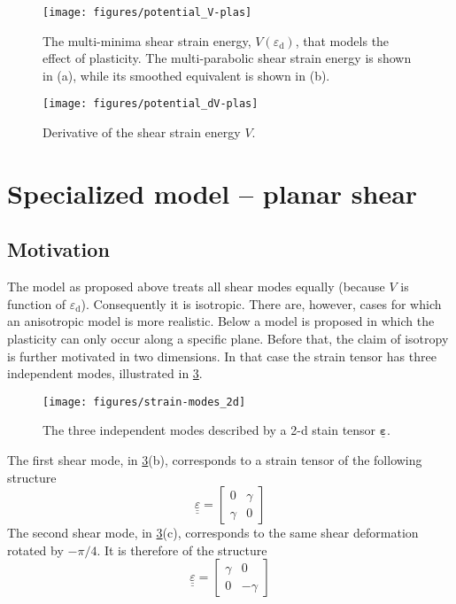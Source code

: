 \documentclass[namecite, fleqn]{goose-article}
\newcommand\T[1]{\underline{\bm{{#1}}}}
\begin{document}
\begin{figure}[htp]
    \centering
    \texttt{[image: figures/potential\_V-plas]}
    \caption{
        The multi-minima shear strain energy, $V ( \varepsilon_\mathrm{d} )$,
        that models the effect of plasticity.
    The multi-parabolic shear strain energy is shown in (a),
    while its smoothed equivalent is shown in (b).}
    \label{fig:V:plas}
\end{figure}

\begin{figure}[htp]
    \centering
    \texttt{[image: figures/potential\_dV-plas]}
    \caption{Derivative of the shear strain energy $V$.}
    \label{fig:dV:plas}
\end{figure}

\section{Specialized model -- planar shear}

\subsection{Motivation}

The model as proposed above treats all shear modes equally
(because $V$ is function of $\varepsilon_\mathrm{d}$).
Consequently it is isotropic.
There are, however, cases for which an anisotropic model is more realistic.
Below a model is proposed in which the plasticity can only occur along a specific plane.
Before that, the claim of isotropy is further motivated in two dimensions.
In that case the strain tensor has three independent modes,
illustrated in \cref{fig:strain-modes:2d}.

\begin{figure}[htp]
    \centering
    \texttt{[image: figures/strain-modes\_2d]}
    \caption{The three independent modes described by a 2-d stain tensor $\T{\varepsilon}$.}
    \label{fig:strain-modes:2d}
\end{figure}

The first shear mode, in \cref{fig:strain-modes:2d}(b),
corresponds to a strain tensor of the following structure
\begin{equation}
    \label{eq:strain-modes:basic}
    \underline{\underline{\varepsilon}}
    =
    \begin{bmatrix}
        0 & \gamma \\
        \gamma & 0
    \end{bmatrix}
\end{equation}
The second shear mode, in \cref{fig:strain-modes:2d}(c),
corresponds to the same shear deformation rotated by $-\pi/4$.
It is therefore of the structure
\begin{equation}
    \underline{\underline{\varepsilon}}
    =
    \begin{bmatrix}
        \gamma & 0 \\
         0 & -\gamma
    \end{bmatrix}
\end{equation}
\end{document}

